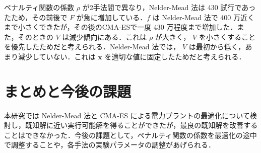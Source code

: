 \documentclass[twocolumn]{jarticle}
\begin{document}
ペナルティ関数の係数 $\rho$ が2手法間で異なり，Nelder-Mead 法は 430 試行であったため，その前後で $F$ が急に増加している．$f$ は Nelder-Mead 法で 400 万近くまで小さくできたが，その後のCMA-ESで一度 430 万程度まで増加した．また，そのときの $V$ は減少傾向にある．これは  $\rho$ が大きく， $V$ を小さくすることを優先したためだと考えられる．Nelder-Mead 法では， $V$ は最初から低く，あまり減少していない．これは $\bm{x}$ を適切な値に固定したためだと考えられる．

\section{まとめと今後の課題}
本研究では Nelder-Mead 法と CMA-ES による電力プラントの最適化について検討し，既知解に近い実行可能解を得ることができたが，最良の既知解を改善することはできなかった．今後の課題として，ペナルティ関数の係数を最適化の途中で調整することや，各手法の実験パラメータの調整があげられる．


\end{document}
